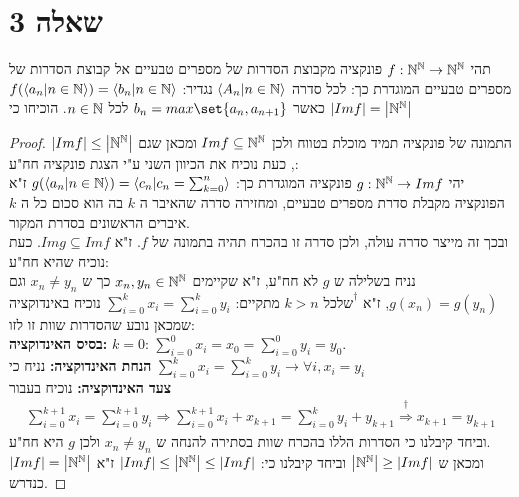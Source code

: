 \documentclass{article}
\DeclarePairedDelimiter\set\{\}
\begin{document}
	\section*{שאלה 3}
	תהי $f: \mathbb{N}^{\mathbb{N}} \rightarrow \mathbb{N}^{\mathbb{N}}$ פונקציה מקבוצת הסדרות של מספרים טבעיים אל קבוצת הסדרות של מספרים טבעיים המוגדרת כך:
	לכל סדרה $\langle A_n | n \in \mathbb{N} \rangle$ נגדיר: $f(\langle a_n | n \in \mathbb{N} \rangle) = \langle b_n | n \in \mathbb{N} \rangle$
	כאשר $b_n = max\set{a_n, a_{n+1}}$ לכל $n \in \mathbb{N}$. הוכיחו כי $\left| Im  f \right| = \left| \mathbb{N}^{\mathbb{N}} \right|$
	\begin{proof}
		התמונה של פונקציה תמיד מוכלת בטווח ולכן $Im  f \subseteq \mathbb{N}^{\mathbb{N}}$ ומכאן שגם $\left| Im  f \right| \leq \left| \mathbb{N}^{\mathbb{N}} \right|$, כעת נוכיח את הכיוון השני ע"י הצגת פונקציה חח"ע: \\
		יהי $g: \mathbb{N}^{\mathbb{N}} \rightarrow Im  f$ פונקציה המוגדרת כך: $g(\langle a_n | n \in \mathbb{N} \rangle) = \langle c_n | c_n = \sum_{k=0}^{n} \rangle$
		ז"א הפונקציה מקבלת סדרת מספרים טבעיים, ומחזירה סדרה שהאיבר ה $k$ בה הוא סכום כל ה $k$ איברים הראשונים בסדרת המקור. \\
		ובכך זה מייצר סדרה עולה, ולכן סדרה זו בהכרח תהיה בתמונה של $f$. ז"א $Im  g \subseteq Im  f$. כעת נוכיח שהיא חח"ע: \\
		נניח בשלילה ש $g$ לא חח"ע, ז"א שקיימים $x_n, y_n \in \mathbb{N}^{\mathbb{N}}$ כך ש $x_n \neq y_n$ וגם $g(x_n) = g(y_n)$,
		ז"א ${\text{שלכל}^\dagger}$ $k > n$ מתקיים: $\sum_{i=0}^k x_i = \sum_{i=0}^k y_i$ נוכיח באינדוקציה שמכאן נובע שהסדרות שוות זו לזו: \\
		\textbf{בסיס האינדוקציה:} $k=0$: $\sum_{i=0}^0 x_i = x_0 = \sum_{i=0}^0 y_i = y_0$. \\
		\textbf{הנחת האינדוקציה:} נניח כי $\sum_{i=0}^k x_i = \sum_{i=0}^k y_i \rightarrow \forall i, x_i = y_i$ \\
		\textbf{צעד האינדוקציה:} נוכיח בעבור
		\begin{align*}
			\sum_{i=0}^{k+1} x_i = \sum_{i=0}^{k+1} y_i
			\Rightarrow \sum_{i=0}^{k+1} x_i + x_{k+1} = \sum_{i=0}^{k} y_i + y_{k+1}
			\overset{\dagger}\Rightarrow x_{k+1} = y_{k+1}
		\end{align*}
		וביחד קיבלנו כי הסדרות הללו בהכרח שוות בסתירה להנחה ש $x_n \neq y_n$ ולכן $g$ היא חח"ע. \\
		ומכאן ש $\left| \mathbb{N}^{\mathbb{N}} \right| \geq \left| Im f \right|$ וביחד קיבלנו כי: $\left| Im  f \right| \leq \left| \mathbb{N}^{\mathbb{N}} \right| \leq \left| Im  f \right|$ ז"א $\left| Im f \right| = \left| \mathbb{N}^{\mathbb{N}} \right|$ כנדרש.
	\end{proof}
\end{document}
